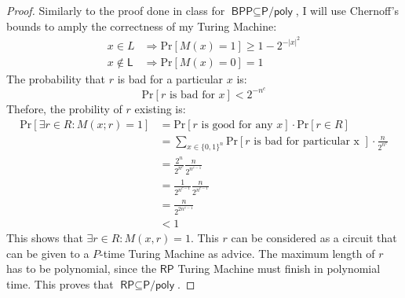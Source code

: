\documentclass[letterpaper,11pt]{article}
\newcommand{\cc}[1]{\ensuremath{\textsf{#1}}\xspace}
\renewcommand{\L}{\cc{L}}
\newcommand{\Ppoly}{\cc{P/poly}}
\newcommand{\BPP}{\cc{BPP}}
\newcommand{\RP}{\cc{RP}}
\newcommand{\Prob}{\mbox{Pr}}
\newcommand{\tm}{Turing Machine}
\begin{document}
\begin{proof}
Similarly to the proof done in class for $\BPP \subseteq \Ppoly$, I will use Chernoff's bounds to amply the correctness of my \tm{}:
\begin{align*}
	x \in L &\Rightarrow \Prob[M(x)=1] \geq 1-2^{{-|x|}^2} \\
	x \not \in \L &\Rightarrow \Prob[M(x) = 0] = 1
\end{align*}
%
The probability that $r$ is bad for a particular $x$ is:
\[
	\Prob[r \mbox{ is bad for } x] < 2^{-n^c}
\]
%
Thefore, the probility of $r$ existing is:
%
\begin{align*}
	\Prob [\exists r \in R : M(x;r) = 1] &= \Prob[r \mbox{ is good for any } x] \cdot \Prob[r \in R] \\
		&= \sum_{x \in \{0,1\}^n} \Prob[r \mbox{ is bad for particular x }] \cdot \frac{n}{2^{n^c}} \\
		&= \frac{2^n}{2^{n^c}} \frac{n}{2^{n^{c-1}}} \\
		&= \frac{1}{2^{n^{c-1}}} \frac{n}{2^{n^{c-1}}} \\
		&= \frac{n}{2^{2n^{c-1}}} \\
		&< 1
\end{align*}
This shows that $\exists r \in R: M(x,r) = 1$.
This $r$ can be considered as a circuit that can be given to a $P$-time \tm{} as advice.
The maximum length of $r$ has to be polynomial, since the $\RP$ \tm{} must finish in polynomial time.
This proves that $\RP \subseteq \Ppoly$.
\end{proof}
\end{document}

